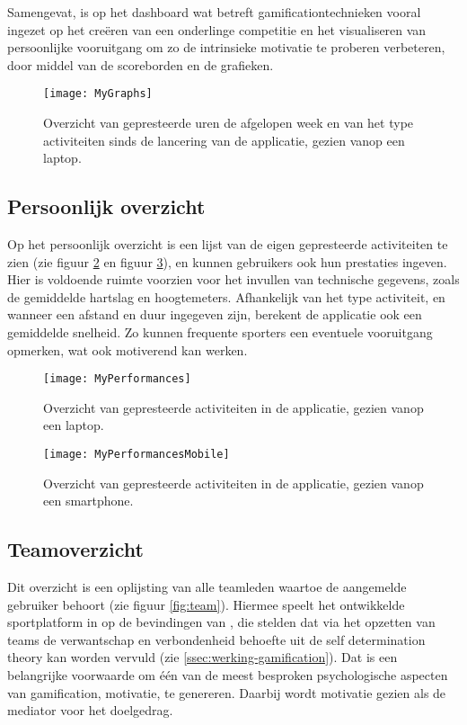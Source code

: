 Samengevat, is op het dashboard wat betreft gamificationtechnieken vooral ingezet op het creëren van een onderlinge competitie en het visualiseren van persoonlijke vooruitgang om zo de intrinsieke motivatie te proberen verbeteren, door middel van de scoreborden en de grafieken.

\begin{figure}[h]
    \caption[Overzicht prestaties dashboard website]{Overzicht van gepresteerde uren de afgelopen week en van het type activiteiten sinds de lancering van de applicatie, gezien vanop een laptop.}
    \texttt{[image: MyGraphs]}
    \label{fig:graphs}
\end{figure}

\subsection{Persoonlijk overzicht}
Op het persoonlijk overzicht is een lijst van de eigen gepresteerde activiteiten te zien (zie figuur \ref{fig:performances} en figuur \ref{fig:performancesMobile}), en kunnen gebruikers ook hun prestaties ingeven. Hier is voldoende ruimte voorzien voor het invullen van technische gegevens, zoals de gemiddelde hartslag en hoogtemeters. Afhankelijk van het type activiteit, en wanneer een afstand en duur ingegeven zijn, berekent de applicatie ook een gemiddelde snelheid. Zo kunnen frequente sporters een eventuele vooruitgang opmerken, wat ook motiverend kan werken.

\begin{figure}[h]
    \caption[Overzicht activiteiten website]{Overzicht van gepresteerde activiteiten in de applicatie, gezien vanop een laptop.}
    \texttt{[image: MyPerformances]}
    \label{fig:performances}
\end{figure}

\begin{figure}[h]
    \caption[Overzicht activiteiten website smartphone]{Overzicht van gepresteerde activiteiten in de applicatie, gezien vanop een smartphone.}
    \texttt{[image: MyPerformancesMobile]}
    \label{fig:performancesMobile}
\end{figure}

\subsection{Teamoverzicht}

Dit overzicht is een oplijsting van alle teamleden waartoe de aangemelde gebruiker behoort (zie figuur \ref{fig:team}). Hiermee speelt het ontwikkelde sportplatform in op de bevindingen van \textcite{Kam2018}, die stelden dat via het opzetten van teams de verwantschap en verbondenheid behoefte uit de self determination theory kan worden vervuld  (zie \ref{ssec:werking-gamification}). Dat is een belangrijke voorwaarde om één van de meest besproken psychologische aspecten van gamification, motivatie, te genereren. Daarbij wordt motivatie gezien als de mediator voor het doelgedrag.

